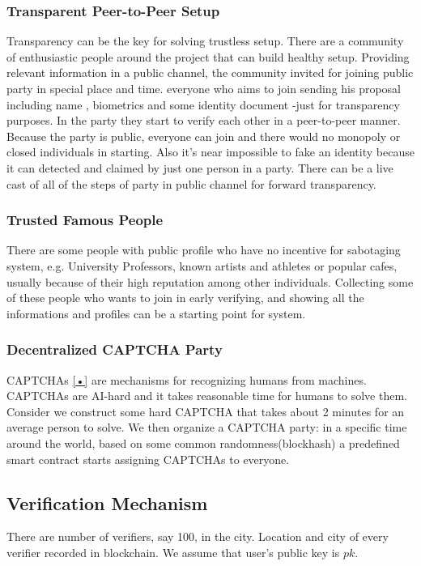 \documentclass{article}
\begin{document}
\subsubsection*{Transparent Peer-to-Peer Setup} 
Transparency can be the key for solving trustless setup. There are a community of enthusiastic people around the project that can build healthy setup. Providing relevant information in a public channel, the community invited for joining public party in special place and time. everyone who aims to join sending his proposal including name , biometrics and some identity document -just for transparency purposes. In the party they start to verify each other in a peer-to-peer manner. Because the party is public, everyone can join and there would no monopoly or closed individuals in starting. Also it's near impossible to fake an identity because it can detected and claimed by just one person in a party. There can be a live cast of all of the steps of party in public channel for forward transparency.

\subsubsection*{Trusted Famous People}
There are some people with public profile who have no incentive for sabotaging system, e.g. University Professors, known artists and athletes or popular cafes, usually because of their high reputation among other individuals. Collecting some of these people who wants to join in early verifying, and showing all the informations and profiles can be a starting point for system.

\subsubsection*{ Decentralized CAPTCHA Party}
CAPTCHAs {\ref{•}} are mechanisms for recognizing humans from machines. CAPTCHAs are AI-hard and it takes reasonable time for humans to solve them. Consider we construct some hard CAPTCHA that takes about 2 minutes for an average person to solve. We then organize a CAPTCHA party: in a specific time around the world, based on some common randomness(blockhash) a predefined smart contract starts assigning CAPTCHAs to everyone. 

\subsection{Verification Mechanism}
There are number of verifiers, say 100, in the city. Location and city of every verifier recorded in blockchain. We assume that user's public key is $pk$.
\\
\end{document}
